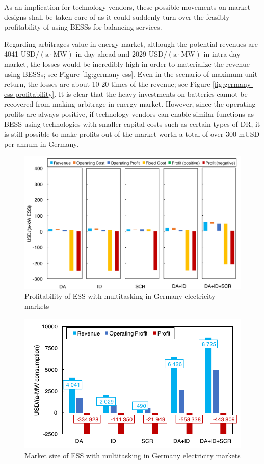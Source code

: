 As an implication for technology vendors, these possible movements on market designs shall be taken care of as it could suddenly turn over the feasibly profitability of using BESSs for balancing services.

Regarding arbitrages value in energy market, although the potential revenues are \num{4041} USD/$(\text{a} \cdot \text{MW})$ in day-ahead and \num{2029} USD/$(\text{a} \cdot \text{MW})$ in intra-day market, the losses would be incredibly high in order to materialize the revenue using BESSs; see Figure \ref{fig:germany-ess}. Even in the scenario of maximum unit return, the losses are about 10-20 times of the revenue; see Figure \ref{fig:germany-ess-profitability}. It is clear that the heavy investments on batteries cannot be recovered from making arbitrage in energy market. However, since the operating profits are always positive, if technology vendors can enable similar functions as BESS using technologies with smaller capital costs such as certain types of DR, it is still possible to make profits out of the market worth a total of over 300 mUSD per annum in Germany.

\begin{figure}[h!]
	\centering
	\includegraphics[width=0.95\linewidth]{Figures/Germany_ESS_profitability_multitasking}
	\caption{Profitability of ESS with multitasking in Germany electricity markets}
	\label{fig:germany-ess-multitasking-profitability}
\end{figure}

\begin{figure}[h!]
	\centering
	\includegraphics[width=0.95\linewidth]{Figures/Germany_ESS_multitasking}
	\caption{Market size of ESS with multitasking in Germany electricity markets}
	\label{fig:germany-ess-multitasking}
\end{figure}

